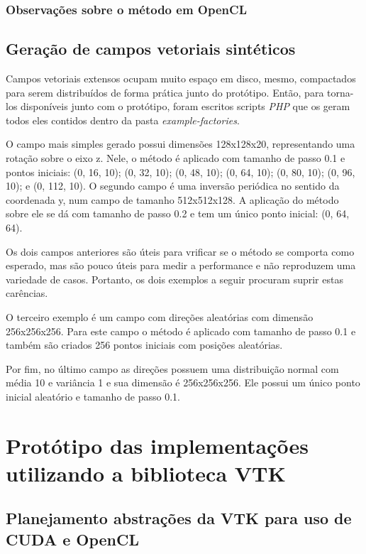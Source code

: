     \subsubsection{Observações sobre o método em OpenCL}
    
  \subsection{Geração de campos vetoriais sintéticos}
  Campos vetoriais extensos ocupam muito espaço em disco, mesmo, compactados para serem distribuídos de forma prática junto do protótipo. Então, para torna-los disponíveis junto com o protótipo, foram escritos scripts \textit{PHP} que os geram todos eles contidos dentro da pasta \textit{example-factories}.
  
  O campo mais simples gerado possui dimensões 128x128x20, representando uma rotação sobre o eixo z. Nele, o método é aplicado com tamanho de passo 0.1 e pontos iniciais: (0, 16, 10); (0, 32, 10); (0, 48, 10); (0, 64, 10); (0, 80, 10); (0, 96, 10); e  (0, 112, 10). O segundo campo é uma inversão periódica no sentido da coordenada y, num campo de tamanho 512x512x128. A aplicação do método sobre ele se dá com tamanho de passo 0.2 e tem um único ponto inicial: (0, 64, 64).
  
  Os dois campos anteriores são úteis para vrificar se o método se comporta como esperado, mas são pouco úteis para medir a performance e não reproduzem uma variedade de casos. Portanto, os dois exemplos a seguir procuram suprir estas carências.
  
  O terceiro exemplo é um campo com direções aleatórias com dimensão 256x256x256. Para este campo o método é aplicado com tamanho de passo 0.1 e também são criados 256 pontos iniciais com posições aleatórias.
  
  Por fim, no último campo as direções possuem uma distribuição normal com média 10 e variância 1 e sua dimensão é 256x256x256. Ele possui um único ponto inicial aleatório e tamanho de passo 0.1.

\section{Protótipo das implementações utilizando a biblioteca VTK}
  \subsection{Planejamento abstrações da VTK para uso de CUDA e OpenCL}

